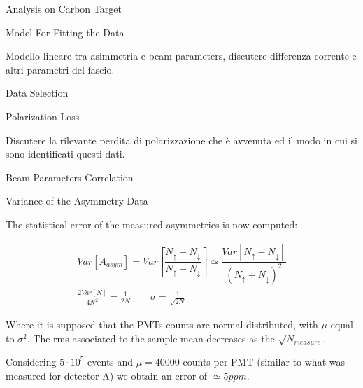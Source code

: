\documentclass[8pt,a4paper]{beamer}
\begin{document}
\begin{frame}{Analysis on Carbon Target}

\end{frame}

\begin{frame}{Model For Fitting the Data}

Modello lineare tra asimmetria e beam parameters, discutere differenza corrente e altri parametri del fascio. 

\end{frame}

\begin{frame}{Data Selection}



\end{frame}

\begin{frame}{Polarization Loss}

Discutere la rilevante perdita di polarizzazione che è avvenuta ed il modo in cui si sono identificati questi dati.

\end{frame}

\begin{frame}{Beam Parameters Correlation}

\end{frame}

\begin{frame}{Variance of the Asymmetry Data}

The statistical error of the measured asymmetries is now computed:

\begin{gather*}
Var[A_{asym}] = Var[\dfrac{N_{\uparrow} - N_{\downarrow}}{ N_{\uparrow} + N_{\downarrow}}] \simeq \dfrac{Var[N_{\uparrow} - N_{\downarrow}]}{(N_{\uparrow} + N_{\downarrow})^{2}} \\
\frac{2Var[N]}{4N^{2}} = \frac{1}{2N} \qquad \sigma = \frac{1}{\sqrt{2N}}
\end{gather*}

Where it is supposed that the PMTs counts are normal distributed, with $\mu$ equal to $\sigma^{2}$. The rms associated to the sample mean decreases as the $\sqrt{N_{measure}}$. 

Considering $5\cdot 10^{5}$ events and $\mu = 40000$ counts per PMT (similar to what was measured for detector A) we obtain an error of $\simeq 5ppm$.

\end{frame}
\end{document}

